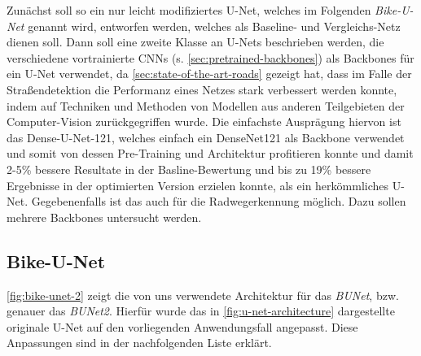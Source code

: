 Zunächst soll so ein nur leicht modifiziertes U-Net, welches im Folgenden \textit{Bike-U-Net} 
genannt wird, entworfen werden, welches als Baseline- und Vergleichs-Netz dienen soll.
Dann soll eine zweite Klasse an U-Nets beschrieben werden, die verschiedene vortrainierte \acp{CNN} (s. \autoref{sec:pretrained-backbones}) 
als Backbones für ein U-Net verwendet, da \autoref{sec:state-of-the-art-roads} gezeigt hat, 
dass im Falle der Straßendetektion die Performanz eines Netzes stark verbessert werden konnte, 
indem auf Techniken und Methoden von Modellen aus anderen Teilgebieten der Computer-Vision 
zurückgegriffen wurde. Die einfachste Ausprägung hiervon ist das Dense-U-Net-121, 
welches einfach ein DenseNet121 als Backbone verwendet und somit von dessen Pre-Training und Architektur
profitieren konnte und damit 2-5\% bessere Resultate in der Basline-Bewertung und bis zu 19\% 
bessere Ergebnisse in der optimierten Version erzielen konnte, als ein herkömmliches U-Net. 
Gegebenenfalls ist das auch für die Radwegerkennung möglich. Dazu sollen mehrere Backbones untersucht werden. 

\subsection{Bike-U-Net} \label{sec:architecture:bike-u-net}

\autoref{fig:bike-unet-2} zeigt die von uns verwendete Architektur für das \textit{\ac{BUNet}}, 
bzw. genauer das \textit{\ac{BUNet2}}. Hierfür wurde das in \autoref{fig:u-net-architecture} 
dargestellte originale U-Net auf den vorliegenden Anwendungsfall angepasst.
Diese Anpassungen sind in der nachfolgenden Liste erklärt.

